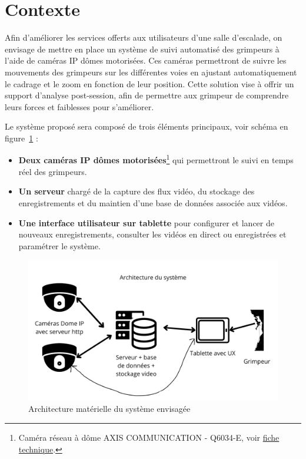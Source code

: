 \documentclass[a4paper, 11pt, french]{article}
\begin{document}

\setcounter{secnumdepth}{3}
\setcounter{tocdepth}{3}
\startcontents[sections]

\tableofcontents
\newpage


\section{Contexte}
Afin d'améliorer les services offerts aux utilisateurs d'une salle d’escalade, on envisage de mettre en place un système de suivi automatisé des grimpeurs à l'aide de caméras IP dômes motorisées. Ces caméras permettront de suivre les mouvements des grimpeurs sur les différentes voies en ajustant automatiquement le cadrage et le zoom en fonction de leur position. Cette solution vise à offrir un support d'analyse post-session, afin de permettre aux grimpeur de comprendre leurs forces et faiblesses pour s'améliorer.

Le système proposé sera composé de trois éléments principaux, voir schéma en figure~\ref{fig:archiMat} :
\begin{itemize}
  \item \textbf{Deux caméras IP dômes motorisées}\footnote{Caméra réseau à dôme AXIS COMMUNICATION - Q6034-E, voir \href{https://www.axis.com/dam/public/11/e4/20/cam\%C3\%A9ra-r\%C3\%A9seau-\%C3\%A0-d\%C3\%B4me-ptz-axis-q6034-e-fr-FR-201515.pdf}{fiche technique}.} qui permettront le suivi en temps réel des grimpeurs.
  \item \textbf{Un serveur} chargé de la capture des flux vidéo, du stockage des enregistrements et du maintien d’une base de données associée aux vidéos.
  \item \textbf{Une interface utilisateur sur tablette} pour configurer et lancer de nouveaux enregistrements, consulter les vidéos en direct ou enregistrées et paramétrer le système.
\end{itemize}

\begin{figure}
  \centering
  \includegraphics[width=.8\textwidth]{Architecture.png}
  \caption{Architecture matérielle du système envisagée}
  \label{fig:archiMat}
\end{figure}
\end{document}
